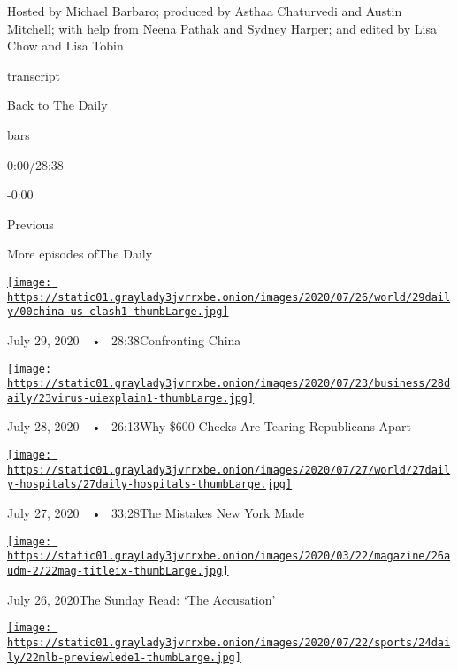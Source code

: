 Hosted by Michael Barbaro; produced by Asthaa Chaturvedi and Austin
Mitchell; with help from Neena Pathak and Sydney Harper; and edited by
Lisa Chow and Lisa Tobin

transcript

Back to The Daily

bars

0:00/28:38

-0:00

Previous

More episodes ofThe Daily

\href{https://www.nytimes3xbfgragh.onion/2020/07/29/podcasts/the-daily/china-trump-foreign-policy.html?action=click\&module=audio-series-bar\&region=header\&pgtype=Article}{\texttt{[image: https://static01.graylady3jvrrxbe.onion/images/2020/07/26/world/29daily/00china-us-clash1-thumbLarge.jpg]}}

July 29, 2020~~•~ 28:38Confronting China

\href{https://www.nytimes3xbfgragh.onion/2020/07/28/podcasts/the-daily/unemployment-benefits-coronavirus.html?action=click\&module=audio-series-bar\&region=header\&pgtype=Article}{\texttt{[image: https://static01.graylady3jvrrxbe.onion/images/2020/07/23/business/28daily/23virus-uiexplain1-thumbLarge.jpg]}}

July 28, 2020~~•~ 26:13Why \$600 Checks Are Tearing Republicans Apart

\href{https://www.nytimes3xbfgragh.onion/2020/07/27/podcasts/the-daily/new-york-hospitals-covid.html?action=click\&module=audio-series-bar\&region=header\&pgtype=Article}{\texttt{[image: https://static01.graylady3jvrrxbe.onion/images/2020/07/27/world/27daily-hospitals/27daily-hospitals-thumbLarge.jpg]}}

July 27, 2020~~•~ 33:28The Mistakes New York Made

\href{https://www.nytimes3xbfgragh.onion/2020/07/26/podcasts/the-daily/the-accusation-the-sunday-read.html?action=click\&module=audio-series-bar\&region=header\&pgtype=Article}{\texttt{[image: https://static01.graylady3jvrrxbe.onion/images/2020/03/22/magazine/26audm-2/22mag-titleix-thumbLarge.jpg]}}

July 26, 2020The Sunday Read: `The Accusation'

\href{https://www.nytimes3xbfgragh.onion/2020/07/24/podcasts/the-daily/mlb-baseball-season-coronavirus.html?action=click\&module=audio-series-bar\&region=header\&pgtype=Article}{\texttt{[image: https://static01.graylady3jvrrxbe.onion/images/2020/07/22/sports/24daily/22mlb-previewlede1-thumbLarge.jpg]}}

